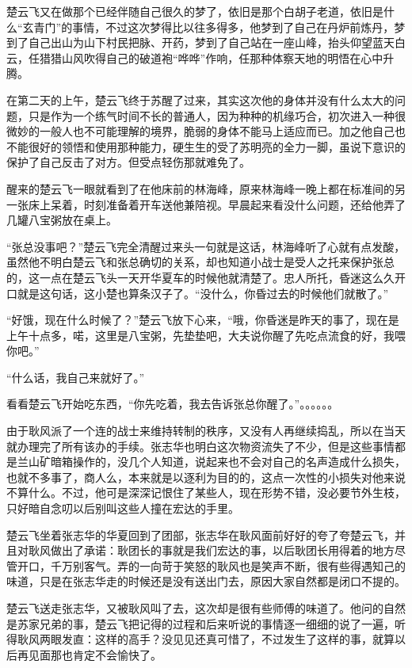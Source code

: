 楚云飞又在做那个已经伴随自己很久的梦了，依旧是那个白胡子老道，依旧是什么“玄青门”的事情，不过这次梦得比以往多得多，他梦到了自己在丹炉前炼丹，梦到了自己出山为山下村民把脉、开药，梦到了自己站在一座山峰，抬头仰望蓝天白云，任猎猎山风吹得自己的破道袍“哗哗”作响，任那种体察天地的明悟在心中升腾。

在第二天的上午，楚云飞终于苏醒了过来，其实这次他的身体并没有什么太大的问题，只是作为一个练气时间不长的普通人，因为种种的机缘巧合，初次进入一种很微妙的一般人也不可能理解的境界，脆弱的身体不能马上适应而已。加之他自己也不能很好的领悟和使用那种能力，硬生生的受了苏明亮的全力一脚，虽说下意识的保护了自己反击了对方。但受点轻伤那就难免了。

醒来的楚云飞一眼就看到了在他床前的林海峰，原来林海峰一晚上都在标准间的另一张床上呆着，时刻准备着开车送他兼陪视。早晨起来看没什么问题，还给他弄了几罐八宝粥放在桌上。

“张总没事吧？”楚云飞完全清醒过来头一句就是这话，林海峰听了心就有点发酸，虽然他不明白楚云飞和张总确切的关系，却也知道小战士是受人之托来保护张总的，这一点在楚云飞头一天开华夏车的时候他就清楚了。忠人所托，昏迷这么久开口就是这句话，这小楚也算条汉子了。“没什么，你昏过去的时候他们就散了。”

“好饿，现在什么时候了？”楚云飞放下心来，“哦，你昏迷是昨天的事了，现在是上午十点多，喏，这里是八宝粥，先垫垫吧，大夫说你醒了先吃点流食的好，我喂你吧。”

“什么话，我自己来就好了。”

看看楚云飞开始吃东西，“你先吃着，我去告诉张总你醒了。”。。。。。。

由于耿风派了一个连的战士来维持转制的秩序，又没有人再继续捣乱，所以在当天就办理完了所有该办的手续。张志华也明白这次物资流失了不少，但是这些事情都是兰山矿暗箱操作的，没几个人知道，说起来也不会对自己的名声造成什么损失，也就不多事了，商人么，本来就是以逐利为目的的，这点一次性的小损失对他来说不算什么。不过，他可是深深记恨住了某些人，现在形势不错，没必要节外生枝，只好暗自念叨以后别叫这些人撞在宏达的手里。

楚云飞坐着张志华的华夏回到了团部，张志华在耿风面前好好的夸了夸楚云飞，并且对耿风做出了承诺：耿团长的事就是我们宏达的事，以后耿团长用得着的地方尽管开口，千万别客气。弄的一向苛于笑怒的耿风也是笑声不断，很有些得遇知己的味道，只是在张志华走的时候还是没有送出门去，原因大家自然都是闭口不提的。

楚云飞送走张志华，又被耿风叫了去，这次却是很有些师傅的味道了。他问的自然是苏家兄弟的事，楚云飞把记得的过程和后来听说的事情逐一细细的说了一遍，听得耿风两眼发直：这样的高手？没见见还真可惜了，不过发生了这样的事，就算以后再见面那也肯定不会愉快了。

